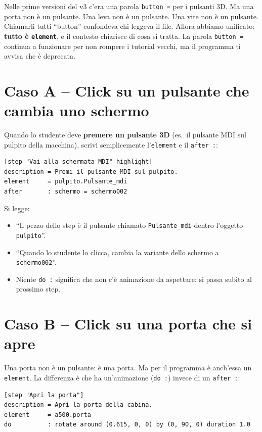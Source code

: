 ﻿\documentclass[a4paper,12pt,oneside]{book}
\newcommand{\kw}[1]{\texttt{\color{keycolor}#1}}
\begin{document}
\begin{notablu}
Nelle prime versioni del v3 c'era una parola \kw{button =} per i pulsanti
3D. Ma una porta non è un pulsante. Una leva non è un pulsante. Una vite
non è un pulsante. Chiamarli tutti ``button'' confondeva chi leggeva il
file. Allora abbiamo unificato: \textbf{tutto è \kw{element}}, e il
contesto chiarisce di cosa si tratta. La parola \kw{button =} continua a
funzionare per non rompere i tutorial vecchi, ma il programma ti avvisa
che è deprecata.
\end{notablu}

\section{Caso A -- Click su un pulsante che cambia uno schermo}

Quando lo studente deve \textbf{premere un pulsante 3D} (es.\ il pulsante MDI
sul pulpito della macchina), scrivi semplicemente l'\kw{element} e il
\kw{after :}:

\begin{lstlisting}
[step "Vai alla schermata MDI" highlight]
description = Premi il pulsante MDI sul pulpito.
element     = pulpito.Pulsante_mdi
after       : schermo = schermo002
\end{lstlisting}

Si legge:

\begin{itemize}
  \item ``Il pezzo dello step è il pulsante chiamato \texttt{Pulsante\_mdi}
        dentro l'oggetto \texttt{pulpito}''.
  \item ``Quando lo studente lo clicca, cambia la variante dello schermo a
        \texttt{schermo002}''.
  \item Niente \kw{do :} significa che non c'è animazione da aspettare: si
        passa subito al prossimo step.
\end{itemize}

\section{Caso B -- Click su una porta che si apre}

Una porta non è un pulsante: è una porta. Ma per il programma è anch'essa
un \kw{element}. La differenza è che ha un'animazione (\kw{do :}) invece di
un \kw{after :}:

\begin{lstlisting}
[step "Apri la porta"]
description = Apri la porta della cabina.
element     = a500.porta
do          : rotate around (0.615, 0, 0) by (0, 90, 0) duration 1.0
\end{lstlisting}
\end{document}
